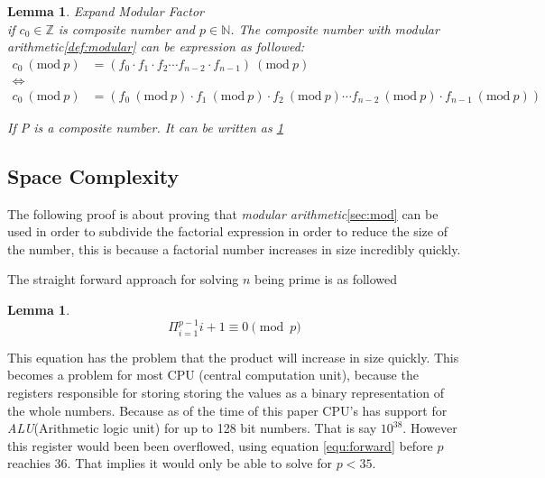 \documentclass[12pt, oneside, onecolumn]{article}
\newtheorem{lemma}[theorem]{Lemma}
\newcommand{\Mod}[1]{\ (\mathrm{mod}\ #1)}
\begin{document}
%
\begin{lemma}{Expand Modular Factor}
\\
if $c_0 \in \mathbb{Z}$ is composite number and $p \in \mathbb{N}$. The composite number with modular arithmetic\ref{def:modular} can be expression as followed:
\begin{equation}
\begin{split}
c_0 \Mod{p} &= (f_0 \cdot f_1 \cdot f_2 \cdots f_{n-2} \cdot f_{n-1} ) \Mod{p} \\
\iff \\
c_0 \Mod{p} &= (f_0 \Mod{p} \cdot f_1 \Mod{p} \cdot f_2 \Mod{p} \cdots f_{n-2} \Mod{p} \cdot f_{n-1} \Mod{p} )
\end{split}
\end{equation}\label{equ:modprodgen}

If P is a composite number. It can be written as \ref{equ:modprodgen}
\end{lemma}


\subsection{Space Complexity}\label{pro:spacecomplexity}
The following proof is about proving that \emph{modular arithmetic}\ref{sec:mod} can be used in order to subdivide the factorial expression in order to reduce the size of the number, this is because a factorial number increases in size incredibly quickly.


%
The straight forward approach for solving $n$ being prime is as followed
\begin{lemma}
\begin{equation}\label{equ:forward}
\Pi_{i = 1}^{p-1} i + 1 \equiv 0 \pmod p
\end{equation}
\end{lemma}

This equation has the problem that the product will increase in size quickly. This becomes a problem for most CPU (central computation unit), because the registers responsible for storing storing the values as a binary representation of the whole numbers. Because as of the time of this paper CPU's has support for \emph{ALU}(Arithmetic logic unit) for up to 128 bit numbers. That is say $10^{38}$. However this register would been been overflowed, using equation \ref{equ:forward} before $p$ reachies $36$. That implies it would only be able to solve for $p < 35$.
\end{document}

